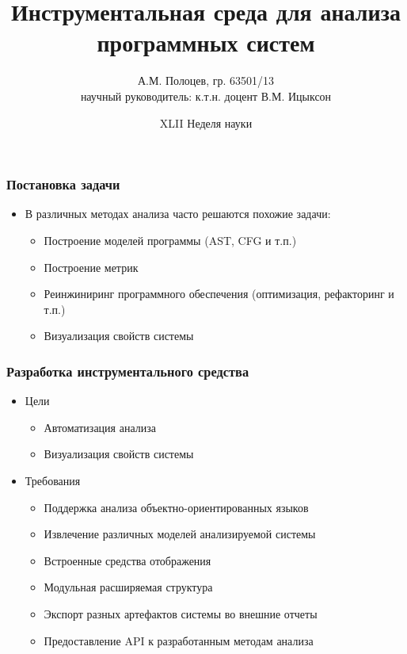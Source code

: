\documentclass{beamer}
\title[]{Инструментальная среда для анализа программных систем}
\author[А.М. Полоцев]{
    А.М. Полоцев, гр. 63501/13\\
    научный руководитель: к.т.н. доцент В.М. Ицыксон
}
\institute[]{Санкт-Петербургский Политехнический Университет}
\date[XLII Неделя науки]{XLII Неделя науки}
\begin{document}
\frame{\titlepage}
\begin{frame}
\frametitle{Постановка задачи}

\begin{itemize}
    \item В различных методах анализа часто решаются похожие задачи:
    \begin{itemize}
        \item Построение моделей программы (AST, CFG и т.п.)
        \item Построение метрик
        \item Реинжиниринг программного обеспечения (оптимизация, рефакторинг и т.п.)
        \item Визуализация свойств системы
    \end{itemize}
\end{itemize}
\pause
\begin{alertblock}{}
\end{alertblock}

\end{frame}
\begin{frame}
\frametitle{Разработка инструментального средства}

\begin{itemize}
    \item Цели
        \begin{itemize}
            \item Автоматизация анализа
            \item Визуализация свойств системы
        \end{itemize}
    \item Требования
        \begin{itemize}
            \item Поддержка анализа объектно-ориентированных языков
            \item Извлечение различных моделей анализируемой системы
            \item Встроенные средства отображения
            \item Модульная расширяемая структура
            \item Экспорт разных артефактов системы во внешние отчеты
            \item Предоставление API к разработанным методам анализа
        \end{itemize}
\end{itemize}
\end{frame}
\end{document}
